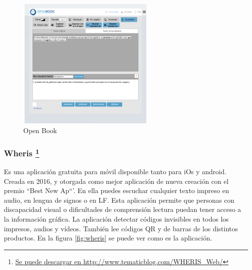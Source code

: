 \begin{figure}[h]
	\centering
	\includegraphics[width=0.6\textwidth]{Imagenes/ProyectosMateriales/openBook}
	\caption{Open Book}
	\label{fig:openBook}
\end{figure} 
\newpage
\subsubsection{Wheris \footnote{\href{http://www.tematicblog.com/WHERIS\_Web//}{Se puede descargar en http://www.tematicblog.com/WHERIS\_Web/}}}

Es una aplicación gratuita para móvil disponible tanto para iOs y android. Creada en 2016, y otorgada como mejor aplicación de nueva creación con el premio ``Best New Ap``’. En ella puedes escuchar cualquier texto impreso en audio, en lengua de signos o en LF. Esta aplicación permite que personas con discapacidad visual o dificultades de comprensión lectura puedan tener acceso a la información gráfica. La aplicación detectar códigos invisibles en todos los impresos, audios y vídeos. También lee códigos QR y de barras de los distintos productos. En la figura \ref{fig:wheris} se puede ver como es la aplicación.



